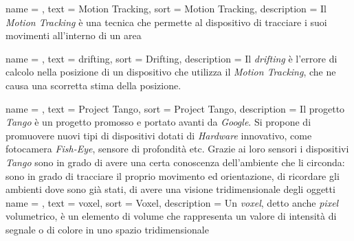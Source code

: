  {
	name = ,
	text = Motion Tracking,
	sort = Motion Tracking,
	description = {Il \emph{Motion Tracking} è una tecnica che permette al dispositivo di tracciare i suoi movimenti all'interno di un area}
}	

 {
	name = ,
	text = drifting,
	sort = Drifting,
	description = {Il \emph{drifting} è l'errore di calcolo nella posizione di un dispositivo che utilizza il \emph{Motion Tracking}, che ne causa una scorretta stima della posizione.}
}	

 {
	name = ,
	text = Project Tango,
	sort = Project Tango,
	description = {Il progetto \emph{Tango} è un progetto promosso e portato avanti da \emph{Google}. Si propone di promuovere nuovi tipi di dispositivi dotati di \emph{Hardware} innovativo, come fotocamera \emph{Fish-Eye}, sensore di profondità etc. Grazie ai loro sensori i dispositivi \emph{Tango} sono in grado di avere una certa conoscenza dell'ambiente che li circonda: sono in grado di tracciare il proprio movimento ed orientazione, di ricordare gli ambienti dove sono già stati, di avere una visione tridimensionale degli oggetti}
}	
%
 {
	name = ,
	text = voxel,
	sort = Voxel,
	description = {Un \emph{voxel}, detto anche \emph{pixel} volumetrico, è un elemento di volume che rappresenta un valore di intensità di segnale o di colore in uno spazio tridimensionale}
}	
%




